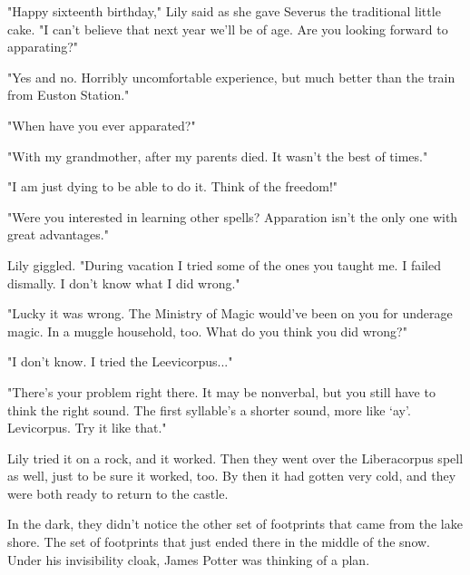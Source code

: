 "Happy sixteenth birthday," Lily said as she gave Severus the traditional little cake. "I can't believe that next year we'll be of age. Are you looking forward to apparating?"

"Yes and no. Horribly uncomfortable experience, but much better than the train from Euston Station."

"When have you ever apparated?"

"With my grandmother, after my parents died. It wasn't the best of times."

"I am just dying to be able to do it. Think of the freedom!"

"Were you interested in learning other spells? Apparation isn't the only one with great advantages."

Lily giggled. "During vacation I tried some of the ones you taught me. I failed dismally. I don't know what I did wrong."

"Lucky it was wrong. The Ministry of Magic would've been on you for underage magic. In a muggle household, too. What do you think you did wrong?"

"I don't know. I tried the Leevicorpus..."

"There's your problem right there. It may be nonverbal, but you still have to think the right sound. The first syllable's a shorter sound, more like `ay'. Levicorpus. Try it like that."

Lily tried it on a rock, and it worked. Then they went over the Liberacorpus spell as well, just to be sure it worked, too. By then it had gotten very cold, and they were both ready to return to the castle.

In the dark, they didn't notice the other set of footprints that came from the lake shore. The set of footprints that just ended there in the middle of the snow. Under his invisibility cloak, James Potter was thinking of a plan. 


